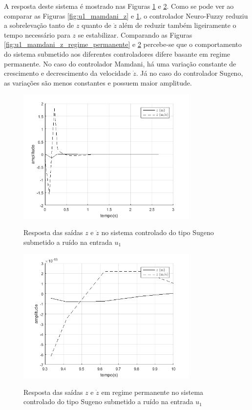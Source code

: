 A resposta deste sistema é mostrado nas Figuras \ref{fig:u1_sugeno_z} e \ref{fig:u1_sugeno_z_regime_permanente}. Como se pode ver ao comparar as Figuras \ref{fig:u1_mamdani_z} e \ref{fig:u1_sugeno_z}, o controlador Neuro-Fuzzy reduziu a sobrelevação tanto de $z$ quanto de $\dot{z}$ além de reduzir também ligeiramente o tempo necessário para $z$ se estabilizar. Comparando as Figuras \ref{fig:u1_mamdani_z_regime_permanente} e \ref{fig:u1_sugeno_z_regime_permanente} percebe-se que o comportamento do sistema submetido aos diferentes controladores difere basante em regime permanente. No caso do controlador Mamdani, há uma variação constante de crescimento e decrescimento da velocidade $\dot{z}$. Já no caso do controlador Sugeno, as variações são menos constantes e possuem maior amplitude.

\begin{figure}[!htb]
    \centering
    \caption{Resposta das saídas $z$ e $\dot{z}$ no sistema controlado do tipo Sugeno submetido a ruído na entrada $u_1$}
    \includegraphics[width=0.8\textwidth]{./04-figuras/resultados/fis_u1/u1_sugeno_z}
    \label{fig:u1_sugeno_z}
\end{figure}

\begin{figure}[!htb]
    \centering
    \caption{Resposta das saídas $z$ e $\dot{z}$ em regime permanente no sistema controlado do tipo Sugeno submetido a ruído na entrada $u_1$}
    \includegraphics[width=0.8\textwidth]{./04-figuras/resultados/fis_u1/u1_sugeno_z_regime_permanente}
    \label{fig:u1_sugeno_z_regime_permanente}
\end{figure}



